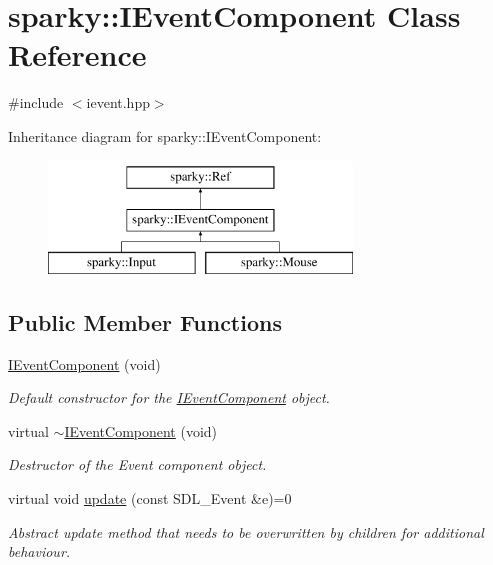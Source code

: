 \hypertarget{classsparky_1_1_i_event_component}{}\section{sparky\+:\+:I\+Event\+Component Class Reference}
\label{classsparky_1_1_i_event_component}


{\ttfamily \#include $<$ievent.\+hpp$>$}

Inheritance diagram for sparky\+:\+:I\+Event\+Component\+:\begin{figure}[H]
\begin{center}
\leavevmode
\includegraphics[height=3.000000cm]{classsparky_1_1_i_event_component}
\end{center}
\end{figure}
\subsection*{Public Member Functions}
\begin{DoxyCompactItemize}
\item 
\hyperlink{classsparky_1_1_i_event_component_a02494448a695dd6bfbc7863f36f63c59}{I\+Event\+Component} (void)
\begin{DoxyCompactList}\small\item\em Default constructor for the \hyperlink{classsparky_1_1_i_event_component}{I\+Event\+Component} object. \end{DoxyCompactList}\item 
virtual \hyperlink{classsparky_1_1_i_event_component_a0e3f5546109e709c7a94e113a5b5a24d}{$\sim$\+I\+Event\+Component} (void)
\begin{DoxyCompactList}\small\item\em Destructor of the Event component object. \end{DoxyCompactList}\item 
virtual void \hyperlink{classsparky_1_1_i_event_component_a061c2e74b185caa2b02bc514c5a1544f}{update} (const S\+D\+L\+\_\+\+Event \&e)=0
\begin{DoxyCompactList}\small\item\em Abstract update method that needs to be overwritten by children for additional behaviour. \end{DoxyCompactList}\end{DoxyCompactItemize}
